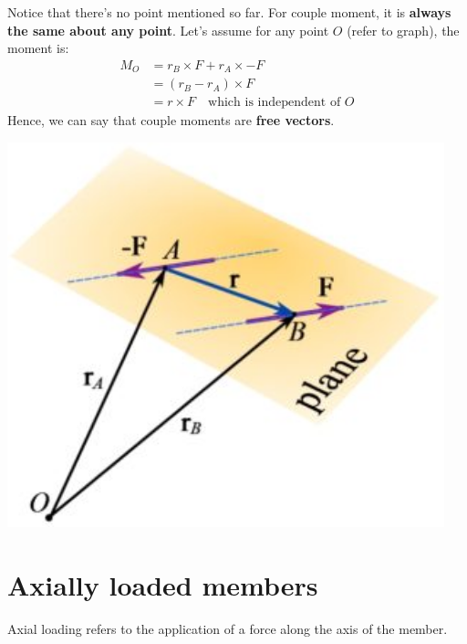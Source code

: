 \begin{minipage}{0.65\textwidth}
    Notice that there's no point mentioned so far. For couple moment, it is \textbf{always the same about any point}. Let's assume for any point $O$ (refer to graph), the moment is:
    \begin{align*}
        M_O & =r_B\times F+r_A\times -F \\&=(r_B-r_A)\times F\\&=r\times F\quad\text{which is independent of }O
    \end{align*}
    Hence, we can say that couple moments are \textbf{free vectors}.
\end{minipage}
\hfill
\begin{minipage}{0.3\textwidth}
    \includegraphics[width=0.95\textwidth]{img/Couple.jpg}
\end{minipage}



\section{Axially loaded members}
Axial loading refers to the application of a force along the axis of the member.
